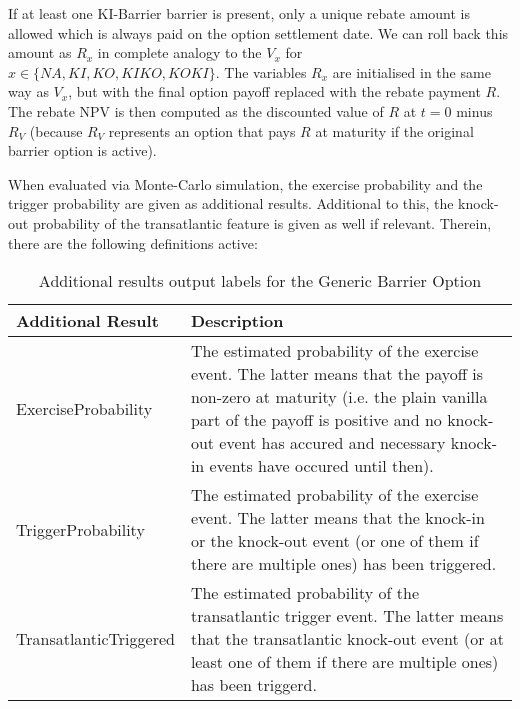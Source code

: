 If at least one KI-Barrier barrier is present, only a unique rebate amount is allowed which is always paid on the option
settlement date. We can roll back this amount as $R_x$ in complete analogy to the $V_x$ for $x \in \{ NA, KI, KO, KIKO,
KOKI \}$. The variables $R_x$ are initialised in the same way as $V_x$, but with the final option payoff replaced with
the rebate payment $R$. The rebate NPV is then computed as the discounted value of $R$ at $t=0$ minus $R_V$ (because
$R_V$ represents an option that pays $R$ at maturity if the original barrier option is active).

When evaluated via Monte-Carlo simulation, the exercise probability and the trigger probability are 
given as additional results. Additional to this, the knock-out probability of the transatlantic feature is given as well if relevant. 
Therein, there are the following definitions active:

\begin{table}[h]
  \begin{tabular}{p{4.5cm}|p{8cm}}
      Additional Result&Description\\ 
      \hline
      ExerciseProbability&The estimated probability of the exercise event. The latter means that the payoff 
      is non-zero at maturity (i.e. the plain vanilla part of the payoff is positive and no knock-out event 
      has accured and necessary knock-in events have occured until then).\\ \hline
      TriggerProbability&The estimated probability of the exercise event. The latter means that the knock-in 
      or the knock-out event (or one of them if there are multiple ones) has been triggered.\\ \hline      
      TransatlanticTriggered&The estimated probability of the transatlantic trigger event. The latter means 
      that the transatlantic knock-out event (or at least one of them if there are multiple ones) has been triggerd.\\ \hline
  \end{tabular}
  \caption{Additional results output labels for the Generic Barrier Option}
  \label{tab:AdditionalResultsGenericBarrier}
\end{table}


